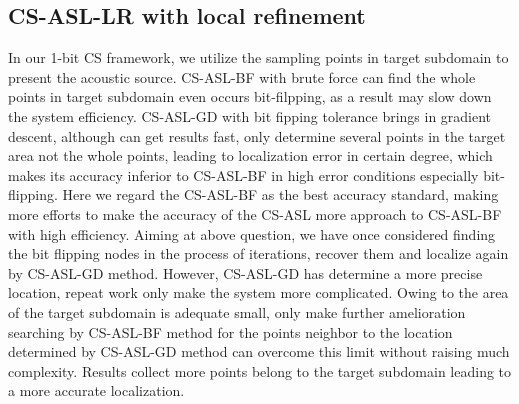 \subsection{CS-ASL-LR with local refinement}
In our 1-bit CS framework, we utilize the sampling points in target subdomain to present the acoustic source. CS-ASL-BF  with brute force can find the whole points in target subdomain even occurs bit-filpping, as a result may slow down the system efficiency. CS-ASL-GD with bit fipping tolerance brings in gradient descent, although can get results fast, only determine several points in the target area not the whole points, leading to localization error in certain degree, which makes its accuracy inferior to CS-ASL-BF in high error conditions especially bit-flipping. Here we regard the CS-ASL-BF as the best accuracy  standard, making more efforts to make the accuracy of the CS-ASL more  approach to CS-ASL-BF with high efficiency. Aiming at above question, we have once considered finding the bit flipping nodes in the process of iterations, recover them and localize again by CS-ASL-GD method. However,  CS-ASL-GD has determine a more precise location, repeat work only make the system more complicated. Owing to the area of the target subdomain is adequate small, only make further amelioration searching by CS-ASL-BF method for the points neighbor to the location determined by CS-ASL-GD method can overcome this limit without raising much complexity. Results collect more points belong to the target subdomain leading to a more accurate localization.
  
